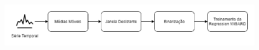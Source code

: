 \begin{figure}[!ht] \label{fig:transforms_order}
    \centering
    \includegraphics[width=5.0in]{img/transforms_order.png}
    \caption{}
\end{figure}


